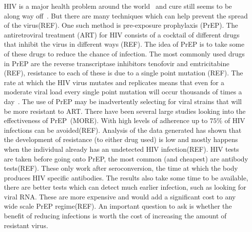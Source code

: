 \documentclass[DIV=15]{scrartcl}
\begin{document}
HIV is a major health problem around  the world~\cite{unaids} and cure still seems to be along way off~\cite{passaes2014}. But there are many techniques which can help prevent the spread of the virus(REF). One such method is pre-exposure prophylaxis (PrEP). The antiretroviral treatment (ART) for HIV consists of a cocktail of different drugs that inhibit the virus in different ways (REF). The idea of PrEP is to take some of these drugs to reduce the chance of infection. 
The most commonly used  drugs in PrEP are the reverse transcriptase inhibitors  tenofovir and emtricitabine (REF), resistance to each of these  is due to a single point mutation (REF). The rate at which the HIV virus mutates and replicates means that even for a moderate viral load  every single point mutation will occur thousands of times a day~\cite{coffin1995}.  %
  The use of PrEP may  be inadvertently selecting for viral  strains that will be more resistant to ART. There have been several large studies looking into the effectiveness of PrEP~\cite{iprex2011,partners2012}(MORE). With high levels of  adherence up to $75\%$ of HIV infections can be avoided(REF). Analysis of the data  generated has shown that the development of resistance (to either drug used) is low and mostly happens when the individual already has an undetected HIV infection(REF). HIV tests are taken before going onto PrEP, the most common (and cheapest) are antibody tests(REF). These only work after seroconversion, the time at which the body produces HIV specific antibodies.  The results also take some  time to be available,  there are better tests which can detect much earlier infection, such as looking for viral RNA. These are more expensive  and would add a significant cost to any wide scale   PrEP regime(REF).
 An important question to ask is whether the benefit of reducing infections is worth the cost of increasing the amount of  resistant virus.
 
\end{document}
